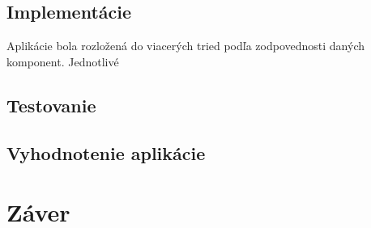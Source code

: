 \section{Implementácie}
Aplikácie bola rozložená do viacerých tried podľa zodpovednosti daných komponent. Jednotlivé






\section{Testovanie}





\section{Vyhodnotenie aplikácie}


















\chapter{Záver}



